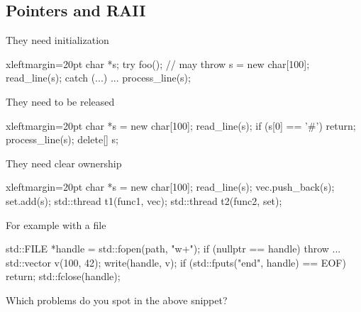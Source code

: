 \subsection[RAII]{Pointers and RAII}

\begin{frame}[fragile]
  \begin{exampleblock}{They need initialization
      \hfill {}}
    \begin{cppcode*}{xleftmargin=20pt}
      char *s;
      try {
        foo(); // may throw
        s = new char[100];
        read_line(s);
      } catch (...) { ... }
      process_line(s);
    \end{cppcode*}
  \end{exampleblock}
  \pause
  \pause
  \vspace{-2cm}
  \begin{exampleblock}{They need to be released
      \hfill {}}
    \begin{cppcode*}{xleftmargin=20pt}
      char *s = new char[100];
      read_line(s);
      if (s[0] == '#') return;
      process_line(s);
      delete[] s;
    \end{cppcode*}
  \end{exampleblock}
  \pause
  \pause
  \vspace{-2cm}
  \begin{exampleblock}{They need clear ownership
      \hfill {}}
    \begin{cppcode*}{xleftmargin=20pt}
      char *s = new char[100];
      read_line(s);
      vec.push_back(s);
      set.add(s);
      std::thread t1(func1, vec);
      std::thread t2(func2, set);
    \end{cppcode*}
  \end{exampleblock}
\end{frame}

\begin{frame}[fragile]
  \begin{exampleblock}{For example with a file}
    \begin{cppcode*}{}
      std::FILE *handle = std::fopen(path, "w+");
      if (nullptr == handle) { throw ... }
      std::vector v(100, 42);
      write(handle, v);
      if (std::fputs("end", handle) == EOF) {
        return;
      }
      std::fclose(handle);
    \end{cppcode*}
  \end{exampleblock}
  \begin{block}{}
    Which problems do you spot in the above snippet?
  \end{block}
\end{frame}

